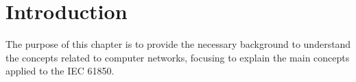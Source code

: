 \section{Introduction}

The purpose of this chapter is to provide the necessary background 
 to understand the concepts related to computer networks, 
focusing to explain the main concepts applied to the IEC 61850. 
